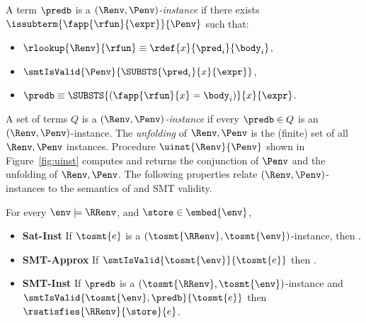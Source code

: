 %
A term $\predb$ is a \emph{$(\Renv,\Penv)$-instance} if
there exists $\issubterm{\fapp{\rfun}{\expr}}{\Penv}$
such that:
%
\begin{itemize}
\item $\rlookup{\Renv}{\rfun} \equiv \rdef{x}{\pred_i}{\body_i}$,
\item $\smtIsValid{\Penv}{\SUBSTS{\pred_i}{x}{\expr}}$,
\item $\predb \equiv \SUBSTS{(\fapp{\rfun}{x} = \body_i)}{x}{\expr}$.
\end{itemize}
%
A set of terms $Q$ is a \emph{$(\Renv, \Penv)$-instance}
if every $\predb \in Q$ is an $(\Renv, \Penv)$-instance.
%
The \emph{unfolding} of $\Renv, \Penv$ is the
(finite) set of all $\Renv, \Penv$ instances.
%
Procedure $\uinst{\Renv}{\Penv}$ shown in
Figure~\ref{fig:uinst} computes and returns
the conjunction of $\Penv$ and the unfolding
of $\Renv, \Penv$.
%
The following properties relate $(\Renv, \Penv)$-instances
to the semantics of \corelan and SMT validity.

\begin{lemma}\label{lem:pbe:semantics}
For every  $\env \models \RRenv$, and $\store\in \embed{\env}$,
\begin{itemize}
\item\textbf{Sat-Inst}  \label{lem:sat-inst}
If $\tosmt{e}$ is a $(\tosmt{\RRenv},\tosmt{\env})$-instance,
then .
\item\textbf{SMT-Approx}\label{lem:smt-approx}
If $\smtIsValid{\tosmt{\env}}{\tosmt{e}}$
then .
\item\textbf{SMT-Inst} \label{lem:smt-inst}
If $\predb$ is a $(\tosmt{\RRenv},\tosmt{\env})$-instance
and $\smtIsValid{\tosmt{\env}, \predb}{\tosmt{e}}$
then $\rsatisfies{\RRenv}{\store}{e}$.
\end{itemize}
\end{lemma}


